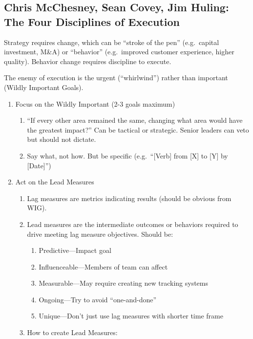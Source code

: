 \documentclass[
]{article}
\begin{document}
\hypertarget{chris-mcchesney-sean-covey-jim-huling-the-four-disciplines-of-execution}{%
\subsection{Chris McChesney, Sean Covey, Jim Huling: The Four
Disciplines of
Execution}\label{chris-mcchesney-sean-covey-jim-huling-the-four-disciplines-of-execution}}

Strategy requires change, which can be ``stroke of the pen''
(e.g.~capital investment, M\&A) or ``behavior'' (e.g.~improved customer
experience, higher quality). Behavior change requires discipline to
execute.

The enemy of execution is the urgent (``whirlwind'') rather than
important (Wildly Important Goals).

\begin{enumerate}
\def\labelenumi{\arabic{enumi}.}
\item
  Focus on the Wildly Important (2-3 goals maximum)

  \begin{enumerate}
  \def\labelenumii{\arabic{enumii}.}
  \item
    ``If every other area remained the same, changing what area would
    have the greatest impact?'' Can be tactical or strategic. Senior
    leaders can veto but should not dictate.
  \item
    Say what, not how. But be specific (e.g.~``{[}Verb{]} from {[}X{]}
    to {[}Y{]} by {[}Date{]}'')
  \end{enumerate}
\item
  Act on the Lead Measures

  \begin{enumerate}
  \def\labelenumii{\arabic{enumii}.}
  \setcounter{enumii}{2}
  \item
    Lag measures are metrics indicating results (should be obvious from
    WIG).
  \item
    Lead measures are the intermediate outcomes or behaviors required to
    drive meeting lag measure objectives. Should be:

    \begin{enumerate}
    \def\labelenumiii{\arabic{enumiii}.}
    \item
      Predictive---Impact goal
    \item
      Influenceable---Members of team can affect
    \item
      Measurable---May require creating new tracking systems
    \item
      Ongoing---Try to avoid ``one-and-done''
    \item
      Unique---Don't just use lag measures with shorter time frame
    \end{enumerate}
  \item
    How to create Lead Measures:


\end{enumerate}
\end{enumerate}
\end{document}
